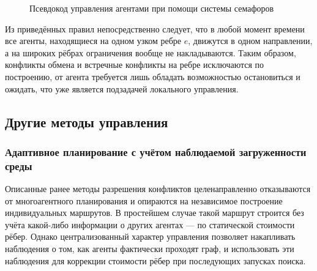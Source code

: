 \begin{figure}
\begin{minipage}{\linewidth}
\begin{algorithm}[H]
    \SetAlgoVlined
\end{algorithm}
\end{minipage}
\caption{Псевдокод управления агентами при помощи системы семафоров}
\label{alg:semaphores}
\end{figure}

Из приведённых правил непосредственно следует, что в любой момент времени все агенты, находящиеся на
одном узком ребре $e$, движутся в одном направлении, а на широких рёбрах ограничения вообще не
накладываются. Таким образом, конфликты обмена и встречные конфликты на ребре исключаются по построению,
от агента требуется лишь обладать возможностью остановиться и ожидать, что уже является подзадачей локального управления.

\subsection{Другие методы управления}

\subsubsection{Адаптивное планирование с учётом наблюдаемой загруженности среды} \label{sec:adaptive-astar}

Описанные ранее методы разрешения конфликтов целенаправленно отказываются от многоагентного планирования 
и опираются на независимое построение индивидуальных маршрутов. В простейшем случае такой маршрут 
строится без учёта какой-либо информации о других агентах --- по статической стоимости рёбер. 
Однако централизованный характер управления позволяет накапливать наблюдения о том, как агенты 
фактически проходят граф, и использовать эти наблюдения для коррекции стоимости рёбер при последующих 
запусках поиска.

